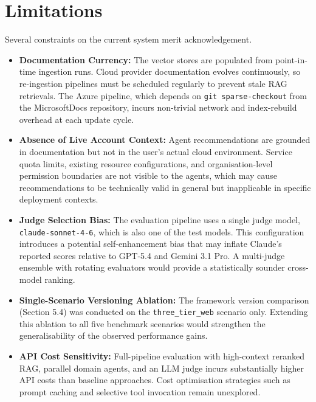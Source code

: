 \section{Limitations}

Several constraints on the current system merit acknowledgement.

\begin{itemize}
    \item \textbf{Documentation Currency:} The vector stores are populated from point-in-time ingestion runs. Cloud provider documentation evolves continuously, so re-ingestion pipelines must be scheduled regularly to prevent stale RAG retrievals. The Azure pipeline, which depends on \texttt{git sparse-checkout} from the MicrosoftDocs repository, incurs non-trivial network and index-rebuild overhead at each update cycle.

    \item \textbf{Absence of Live Account Context:} Agent recommendations are grounded in documentation but not in the user's actual cloud environment. Service quota limits, existing resource configurations, and organisation-level permission boundaries are not visible to the agents, which may cause recommendations to be technically valid in general but inapplicable in specific deployment contexts.

    \item \textbf{Judge Selection Bias:} The evaluation pipeline uses a single judge model, \texttt{claude-sonnet-4-6}, which is also one of the test models. This configuration introduces a potential self-enhancement bias that may inflate Claude's reported scores relative to GPT-5.4 and Gemini 3.1 Pro. A multi-judge ensemble with rotating evaluators would provide a statistically sounder cross-model ranking.

    \item \textbf{Single-Scenario Versioning Ablation:} The framework version comparison (Section 5.4) was conducted on the \texttt{three\_tier\_web} scenario only. Extending this ablation to all five benchmark scenarios would strengthen the generalisability of the observed performance gains.

    \item \textbf{API Cost Sensitivity:} Full-pipeline evaluation with high-context reranked RAG, parallel domain agents, and an LLM judge incurs substantially higher API costs than baseline approaches. Cost optimisation strategies such as prompt caching and selective tool invocation remain unexplored.
\end{itemize}

